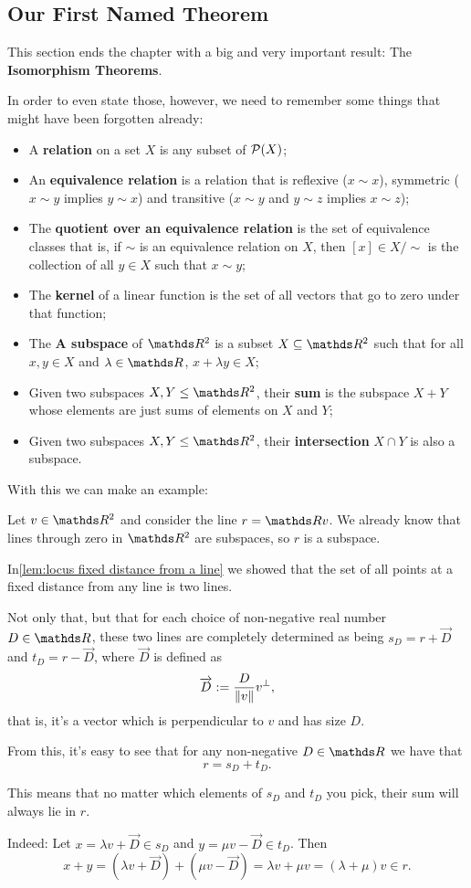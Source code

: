 \newpage
\subsection{Our First Named Theorem}

This section ends the chapter with a big and very important result: The \textbf{Isomorphism Theorems}.

In order to even state those, however, we need to remember some things that might have been forgotten already:

\begin{itemize}
	\item A \textbf{relation} on a set $X$ is any subset of $\mathcal P(X)$;
	\item An \textbf{equivalence relation} is a relation that is reflexive ($x\sim x$), symmetric ($x\sim y$ implies $y\sim x$) and transitive ($x\sim y$ and $y\sim z$ implies $x\sim z$);
	\item The \textbf{quotient over an equivalence relation} is the set of equivalence classes that is, if $\sim$ is an equivalence relation on $X$, then $[x]\in X/\sim$ is the collection of all $y\in X$ such that $x\sim y$;
	\item The \textbf{kernel} of a linear function is the set of all vectors that go to zero under that function;
	\item The \textbf{A \textbf{subspace}} of $\R^2$ is a subset $X\subseteq \R^2$ such that for all $x,y\in X$ and $\lambda \in \R$, $x+\lambda y\in X$;
	\item Given two subspaces $X,Y\leq \R^2$, their \textbf{sum} is the subspace $X+Y$ whose elements are just sums of elements on $X$ and $Y$;
	\item Given two subspaces $X,Y\leq \R^2$, their \textbf{intersection} $X\cap Y$ is also a subspace.
\end{itemize}

With this we can make an example:

\begin{ex}
	Let $v\in \R^2$ and consider the line $r=\R v$. We already know that lines through zero in $\R^2$ are subspaces, so $r$ is a subspace.
	
	In\ref{lem:locus fixed distance from a line} we showed that the set of all points at a fixed distance from any line is two lines.
	
	Not only that, but that for each choice of non-negative real number $D\in \R$, these two lines are completely determined as being $s_D=r+\overrightarrow{D}$ and $t_D=r-\overrightarrow{D}$, where $\overrightarrow{D}$ is defined as
	\[\overrightarrow{D}:=\frac{D}{\lVert v\rVert}v^\perp,\]that is, it's a vector which is perpendicular to $v$ and has size $D$.
	
	From this, it's easy to see that for any non-negative $D\in \R$ we have that
	\[r=s_D+t_D.\]
	
	This means that no matter which elements of $s_D$ and $t_D$ you pick, their sum will always lie in $r$.
	
	Indeed: Let $x=\lambda v+\overrightarrow{D}\in s_D$ and $y=\mu v-\overrightarrow{D}\in t_D$. Then
	\[x+y=(\lambda v+\overrightarrow{D})+(\mu v-\overrightarrow{D})=\lambda v+\mu v=(\lambda+\mu)v\in r.\]
\end{ex}